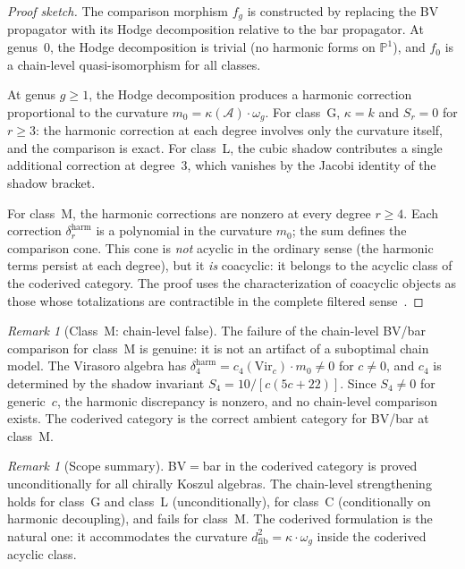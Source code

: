 \documentclass[11pt,reqno]{amsart}
\theoremstyle{definition}
\theoremstyle{remark}
\newtheorem{remark}[theorem]{Remark}
\newcommand{\cA}{\mathcal{A}}
\newcommand{\Vir}{\mathrm{Vir}}
\newcommand{\bP}{\mathbb{P}}
\numberwithin{equation}{section}
\begin{document}
\begin{proof}[Proof sketch]
The comparison morphism $f_g$ is constructed by replacing the BV
propagator with its Hodge decomposition relative to the bar
propagator. At genus~$0$, the Hodge decomposition is trivial (no
harmonic forms on $\bP^1$), and $f_0$ is a chain-level
quasi-isomorphism for all classes.

At genus $g \geq 1$, the Hodge decomposition produces a harmonic
correction proportional to the curvature
$m_0 = \kappa(\cA) \cdot \omega_g$. For class~G,
$\kappa = k$ and $S_r = 0$ for $r \geq 3$: the harmonic
correction at each degree involves only the curvature itself,
and the comparison is exact. For class~L, the cubic shadow
contributes a single additional correction at degree~$3$,
which vanishes by the Jacobi identity of the shadow bracket.

For class~M, the harmonic corrections are nonzero at
every degree $r \geq 4$. Each correction
$\delta_r^{\mathrm{harm}}$ is a polynomial in the curvature
$m_0$; the sum defines the comparison cone. This cone is
\emph{not} acyclic in the ordinary sense (the harmonic
terms persist at each degree), but it \emph{is} coacyclic:
it belongs to the acyclic class of the coderived category.
The proof uses the characterization of coacyclic objects as
those whose totalizations are contractible in the complete
filtered sense~\cite[\S3.7]{PP}.
\end{proof}

\begin{remark}[Class~M: chain-level false]
\label{rem:kfc-class-m-chain-false}
The failure of the chain-level BV/bar comparison for class~M
is genuine: it is not an artifact of a suboptimal chain model.
The Virasoro algebra has
$\delta_4^{\mathrm{harm}} = c_4(\Vir_c) \cdot m_0 \neq 0$
for $c \neq 0$, and $c_4$ is determined by the shadow
invariant $S_4 = 10/[c(5c+22)]$. Since $S_4 \neq 0$ for
generic~$c$, the harmonic discrepancy is nonzero, and no
chain-level comparison exists. The coderived category is
the correct ambient category for BV/bar at class~M.
\end{remark}

\begin{remark}[Scope summary]
\label{rem:kfc-bv-scope}
BV$=$bar in the coderived category is proved unconditionally for
all chirally Koszul algebras. The chain-level strengthening holds
for class~G and class~L (unconditionally), for class~C
(conditionally on harmonic decoupling), and fails for class~M.
The coderived formulation is the natural one: it accommodates
the curvature $d^2_{\mathrm{fib}} = \kappa \cdot \omega_g$
inside the coderived acyclic class.
\end{remark}
\end{document}
